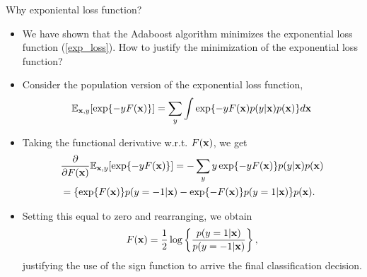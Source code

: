 \documentclass{beamer}
\def\bfx{{\bf x}}
\begin{document}
                     \begin{frame}{Why exponiental loss function?}
                     \begin{itemize}\small
                      \item We have shown that the Adaboost algorithm minimizes the exponential loss function (\ref{exp_loss}). How to justify the minimization of the exponential loss function?
                      \item Consider the population version of the exponential loss function, 
                      $$\mathbb{E}_{\bfx,y}[\exp \{-y F(\bfx)\}]=\sum_y \int \exp\{-y F(\bfx)p(y|\bfx)p(\bfx)\}d\bfx$$
                      \item Taking the functional derivative w.r.t. $F(\bfx)$, we get
                      \begin{align*}
                      &\frac{\partial}{\partial F(\bfx)}\mathbb{E}_{\bfx,y}[\exp\{-y F(\bfx)\} ]=-\sum_y y\exp\{-y F(\bfx)\}p(y|\bfx)p(\bfx)\\
                      &=\{\exp\{F(\bfx)\}p(y=-1|\bfx)-\exp\{-F(\bfx)\}p(y=1|\bfx) \}p(\bfx).
                      \end{align*}
                      \item Setting this equal to zero and rearranging, we obtain
                      $$F(\bfx)= \frac{1}{2}\log \left\{\frac{p(y=1|\bfx)}{p(y=-1|\bfx)}\right\},$$
                      justifying the use of the sign function to arrive the final classification decision.
                      \end{itemize}
                     \end{frame}
\end{document}
